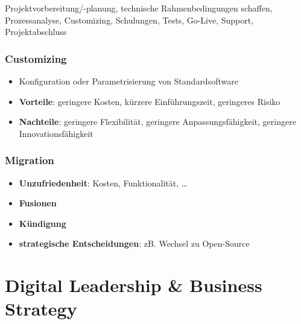 \documentclass{article}
\begin{document}
Projektvorbereitung/-planung, technische Rahmenbedingungen schaffen, Prozessanalyse, Customizing, Schulungen, Tests, Go-Live, Support, Projektabschluss

\subsubsection{Customizing}

\begin{itemize}
  \item Konfiguration oder Parametrisierung von Standardsoftware
  \item \textbf{Vorteile}: geringere Kosten, kürzere Einführungszeit, geringeres Risiko
  \item \textbf{Nachteile}: geringere Flexibilität, geringere Anpassungsfähigkeit, geringere Innovationsfähigkeit
\end{itemize}

\subsubsection{Migration}

\begin{itemize}
  \item \textbf{Unzufriedenheit}: Kosten, Funktionalität, …
  \item \textbf{Fusionen}
  \item \textbf{Kündigung}
  \item \textbf{strategische Entscheidungen}: zB. Wechsel zu Open-Source
\end{itemize}

\section{Digital Leadership \& Business Strategy}
\end{document}
